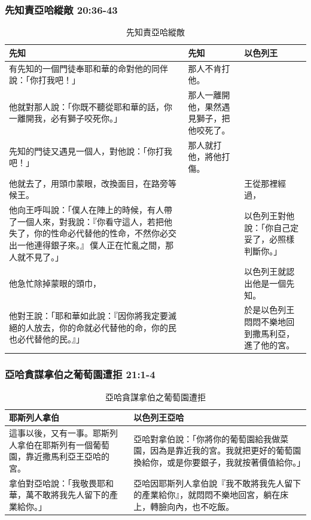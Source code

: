\subsubsection{先知責亞哈縱敵 20:36-43}
\begin{table}[H]
\centering 
{}
\begin{tabular}{p{9.75cm}|p{2.5cm}|p{4.75cm}}\hline\hline
先知&先知&以色列王\\\hline
有先知的一個門徒奉耶和華的命對他的同伴說：「你打我吧！」&那人不肯打他。&\\\hline
他就對那人說：「你既不聽從耶和華的話，你一離開我，必有獅子咬死你。」&那人一離開他，果然遇見獅子，把他咬死了。&\\\hline
先知的門徒又遇見一個人，對他說：「你打我吧！」&那人就打他，將他打傷。&\\\hline
他就去了，用頭巾蒙眼，改換面目，在路旁等候王。&&王從那裡經過，\\\hline
他向王呼叫說：「僕人在陣上的時候，有人帶了一個人來，對我說：『你看守這人，若把他失了，你的性命必代替他的性命，不然你必交出一他連得銀子來。』 僕人正在忙亂之間，那人就不見了。」&&以色列王對他說：「你自己定妥了，必照樣判斷你。」\\\hline
他急忙除掉蒙眼的頭巾，&&以色列王就認出他是一個先知。\\\hline
他對王說：「耶和華如此說：『因你將我定要滅絕的人放去，你的命就必代替他的命，你的民也必代替他的民。』」&&於是以色列王悶悶不樂地回到撒馬利亞，進了他的宮。\\\hline
\end{tabular}
\caption{先知責亞哈縱敵}
\end{table} 


\subsubsection{亞哈貪謀拿伯之葡萄園遭拒 21:1-4}
\begin{table}[H]
\centering 
{}
\begin{tabular}{p{7.25cm}|p{}}\hline\hline
耶斯列人拿伯&以色列王亞哈\\\hline
這事以後，又有一事。耶斯列人拿伯在耶斯列有一個葡萄園，靠近撒馬利亞王亞哈的宮。&亞哈對拿伯說：「你將你的葡萄園給我做菜園，因為是靠近我的宮。我就把更好的葡萄園換給你，或是你要銀子，我就按著價值給你。」 \\\hline
拿伯對亞哈說：「我敬畏耶和華，萬不敢將我先人留下的產業給你。」&亞哈因耶斯列人拿伯說『我不敢將我先人留下的產業給你』，就悶悶不樂地回宮，躺在床上，轉臉向內，也不吃飯。\\\hline
\end{tabular}
\caption{亞哈貪謀拿伯之葡萄園遭拒}
\end{table} 


